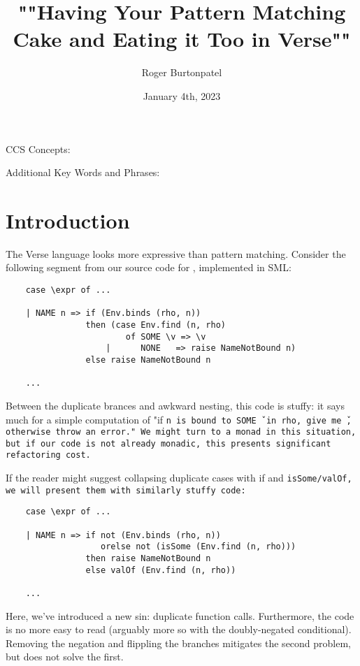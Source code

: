 \documentclass[]{article}
\title{""Having Your Pattern Matching Cake and Eating it Too in Verse""}
\author{Roger Burtonpatel}
\date{January 4th, 2023}
\begin{document}
\maketitle

CCS Concepts: 

\bigskip

Additional Key Words and Phrases: 

\bigskip

\section{Introduction}

The Verse language looks more expressive than pattern matching. 
Consider the following segment from our source code for \VMinus, implemented
in SML:

\smllst 

\begin{lstlisting}
    case \expr of ...

    | NAME n => if (Env.binds (rho, n))
                then (case Env.find (n, rho) 
                        of SOME \v => \v 
                    |      NONE   => raise NameNotBound n)
                else raise NameNotBound n 

    ...
\end{lstlisting}

Between the duplicate brances and awkward nesting, this code is stuffy: it says
much for a simple computation of "if \tt{n} is bound to \tt{SOME \v} in \tt{rho},
give me \tt{\v}, otherwise throw an error." We might turn to a monad in this
situation, but if our code is not already monadic, this presents significant
refactoring cost. 

\bigskip
If the reader might suggest collapsing duplicate cases with if and
\tt{isSome}/\tt{valOf}, we will present them with similarly stuffy code: 
\begin{lstlisting}
    case \expr of ...

    | NAME n => if not (Env.binds (rho, n))
                   orelse not (isSome (Env.find (n, rho)))
                then raise NameNotBound n 
                else valOf (Env.find (n, rho))

    ...
\end{lstlisting}

Here, we've introduced a new sin: duplicate function calls. Furthermore, the
code is no more easy to read (arguably more so with the doubly-negated
conditional). Removing the negation and flippling the branches mitigates the 
second problem, but does not solve the first. 
\end{document}
